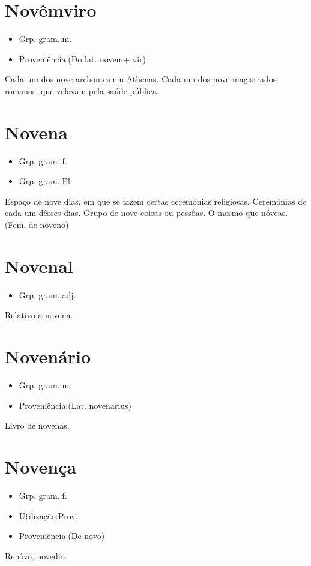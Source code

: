 \section{Novêmviro}
\begin{itemize}
\item {Grp. gram.:m.}
\end{itemize}
\begin{itemize}
\item {Proveniência:(Do lat. \textunderscore novem\textunderscore  + \textunderscore vir\textunderscore )}
\end{itemize}
Cada um dos nove archontes em Athenas.
Cada um dos nove magistrados romanos, que velavam pela saúde pública.
\section{Novena}
\begin{itemize}
\item {Grp. gram.:f.}
\end{itemize}
\begin{itemize}
\item {Grp. gram.:Pl.}
\end{itemize}
Espaço de nove dias, em que se fazem certas ceremónias religiosas.
Ceremónias de cada um dêsses dias.
Grupo de nove coisas ou pessôas.
O mesmo que \textunderscore nóveas\textunderscore .
(Fem. de \textunderscore noveno\textunderscore )
\section{Novenal}
\begin{itemize}
\item {Grp. gram.:adj.}
\end{itemize}
Relativo a novena.
\section{Novenário}
\begin{itemize}
\item {Grp. gram.:m.}
\end{itemize}
\begin{itemize}
\item {Proveniência:(Lat. \textunderscore novenarius\textunderscore )}
\end{itemize}
Livro de novenas.
\section{Novença}
\begin{itemize}
\item {Grp. gram.:f.}
\end{itemize}
\begin{itemize}
\item {Utilização:Prov.}
\end{itemize}
\begin{itemize}
\item {Proveniência:(De \textunderscore novo\textunderscore )}
\end{itemize}
Renôvo, novedio.
